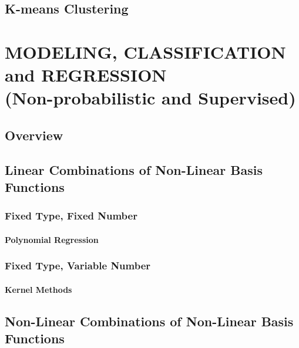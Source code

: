 \documentclass{book}
\begin{document}
\chapter{K-means Clustering}




\part{MODELING, CLASSIFICATION and REGRESSION\\(Non-probabilistic and Supervised)}

\chapter{Overview}




\chapter{Linear Combinations of Non-Linear Basis Functions}

\section{Fixed Type, Fixed Number} 
\subsection{Polynomial Regression}

\section{Fixed Type, Variable Number}
\subsection{Kernel Methods}

\chapter{Non-Linear Combinations of Non-Linear Basis Functions}
\end{document}
